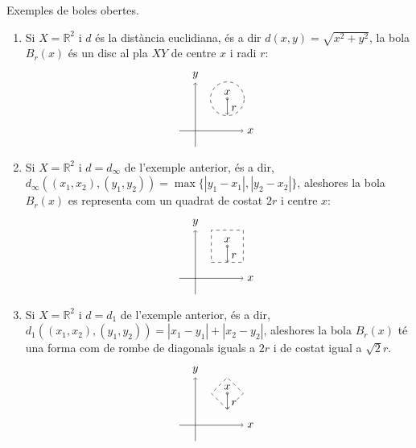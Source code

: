 \documentclass[../main.tex]{subfiles}
\begin{document}
\begin{ej}
Exemples de boles obertes.
\begin{enumerate}[(1)]
    \item Si $X=\mathbb{R}^2$ i $d$ és la distància euclidiana, és a dir $d(x,y) = \sqrt{x^2+y^2}$, la bola $B_r(x)$ és un disc al pla $XY$ de centre $x$ i radi $r$:
    \begin{equation}
        \notag
        \begin{tikzpicture}[scale = 0.5]
            \draw[->] (-1,0) -- (3,0) node[right] {$x$};
            \draw[->] (0,-1) -- (0,3) node[above] {$y$};
            \draw[dashed] (2,2) circle (30pt);
            \draw (2,2) circle (2pt) node[above] {$x$};
            \draw[->] (2,2) -- (2,1) node[anchor = south west] {$r$};
        \end{tikzpicture}
    \end{equation}
    \item Si $X = \mathbb{R}^2$ i $d = d_\infty$ de l'exemple anterior, és a dir, $d_\infty((x_1,x_2),(y_1,y_2)) = \max\{|y_1-x_1|,|y_2-x_2|\}$, aleshores la bola $B_r(x)$ es representa com un quadrat de costat $2r$ i centre $x$:
    \begin{equation}
        \notag
        \begin{tikzpicture}[scale = 0.5]
            \draw[->] (-1,0) -- (3,0) node[right] {$x$};
            \draw[->] (0,-1) -- (0,3) node[above] {$y$};
            \draw[dashed] (1,1) -- (3,1) -- (3,3) -- (1,3) -- (1,1);
            \draw (2,2) circle (2pt) node[above] {$x$};
            \draw[->] (2,2) -- (2,1) node[anchor = south west] {$r$};
        \end{tikzpicture}
    \end{equation}
    
    
    
    \item Si $X = \mathbb{R}^2$ i $d = d_1$ de l'exemple anterior, és a dir, $d_1((x_1,x_2),(y_1,y_2)) = |x_1-y_1| + |x_2-y_2|$, aleshores la bola $B_r(x)$ té una forma com de rombe de diagonals iguals a $2r$ i de costat igual a $\sqrt{2}r$.
    \begin{equation}
        \notag
        \begin{tikzpicture}[scale = 0.5]
            \draw[->] (-1,0) -- (3,0) node[right] {$x$};
            \draw[->] (0,-1) -- (0,3) node[above] {$y$};
            \draw[dashed] (2,1) -- (3,2) -- (2,3) -- (1,2) -- (2,1);
            \draw (2,2) circle (2pt) node[above] {$x$};
            \draw[->] (2,2) -- (2,1) node[anchor = south west] {$r$};
        \end{tikzpicture}
    \end{equation}
    

\end{enumerate}
\end{ej}
\end{document}
